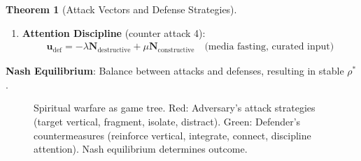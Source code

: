 \documentclass[11pt,a4paper]{article}
\theoremstyle{definition}
\newtheorem{theorem}{Theorem}[section]
\theoremstyle{remark}
\newcommand{\cc}{\mathbf{c}}
\begin{document}
\begin{enumerate}
\begin{theorem}[Attack Vectors and Defense Strategies]
\begin{enumerate}
    \item \textbf{Attention Discipline} (counter attack 4):
        \begin{align}
        \mathbf{u}_{\text{def}} = -\lambda \mathbf{N}_{\text{destructive}} + \mu \mathbf{N}_{\text{constructive}} \quad \text{(media fasting, curated input)}
        \end{align}
\end{enumerate}

\textbf{Nash Equilibrium}: Balance between attacks and defenses, resulting in stable \(\rho^*\).
\end{theorem}

\begin{figure}[H]
\centering
{}
\caption{Spiritual warfare as game tree. Red: Adversary's attack strategies (target vertical, fragment, isolate, distract). Green: Defender's countermeasures (reinforce vertical, integrate, connect, discipline attention). Nash equilibrium determines outcome.}
\label{fig:spiritual_warfare_game}
\end{figure}


\end{enumerate}
\end{document}
